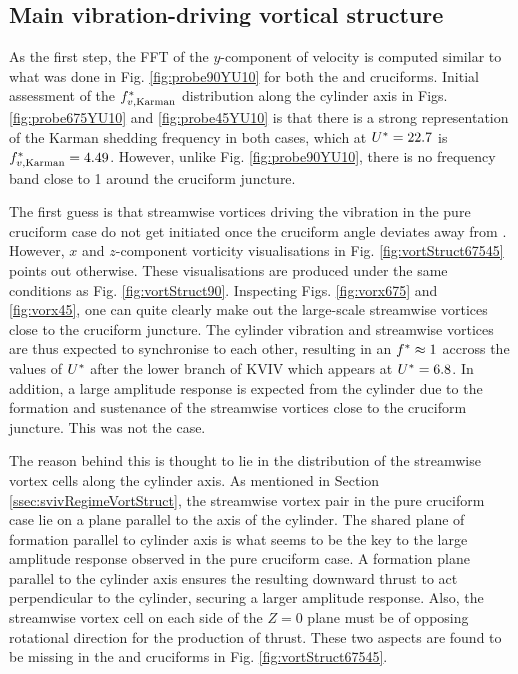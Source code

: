 \documentclass[oneside]{utmthesis}
\begin{document}
\subsection{Main vibration-driving vortical structure}\label{ssec:transitionalRegimeVortStruct}
As the first step, the FFT of the $y$-component of velocity is computed similar to what was done in Fig. \ref{fig:probe90YU10} for both the \angfo{} and \angth{} cruciforms. Initial assessment of the $f^{*}_{v,\text{Karman}}$ distribution along the cylinder axis in Figs. \ref{fig:probe675YU10} and \ref{fig:probe45YU10} is that there is a strong representation of the Karman shedding frequency in both cases, which at $U^{*} = 22.7$ is $f^{*}_{v,\text{Karman}} = 4.49$. However, unlike Fig. \ref{fig:probe90YU10}, there is no frequency band close to 1 around the cruciform juncture.

The first guess is that streamwise vortices driving the vibration in the pure cruciform case do not get initiated once the cruciform angle deviates away from \angfi{}. However, $x$ and $z$-component vorticity visualisations in Fig. \ref{fig:vortStruct67545} points out otherwise. These visualisations are produced under the same conditions as Fig. \ref{fig:vortStruct90}. Inspecting Figs. \ref{fig:vorx675} and \ref{fig:vorx45}, one can quite clearly make out the large-scale streamwise vortices close to the cruciform juncture. The cylinder vibration and streamwise vortices are thus expected to synchronise to each other, resulting in an $f^{*} \approx 1$ accross the values of $U^{*}$ after the lower branch of KVIV which appears at $U^{*} = 6.8$. In addition, a large amplitude response is expected from the cylinder due to the formation and sustenance of the streamwise vortices close to the cruciform juncture. This was not the case.

The reason behind this is thought to lie in the distribution of the streamwise vortex cells along the cylinder axis. As mentioned in Section \ref{ssec:svivRegimeVortStruct}, the streamwise vortex pair in the pure cruciform case lie on a plane parallel to the axis of the cylinder. The shared plane of formation parallel to cylinder axis is what seems to be the key to the large amplitude response observed in the pure cruciform case. A formation plane parallel to the cylinder axis ensures the resulting downward thrust to act perpendicular to the cylinder, securing a larger amplitude response. Also, the streamwise vortex cell on each side of the $Z = 0$ plane must be of opposing rotational direction for the production of thrust. These two aspects are found to be missing in the \angfo{} and \angth{} cruciforms in Fig. \ref{fig:vortStruct67545}.
\end{document}
